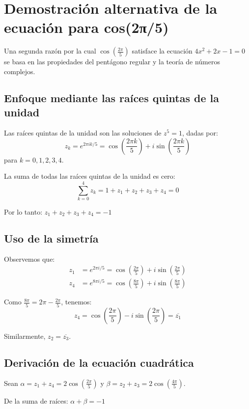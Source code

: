 \section{Demostración alternativa de la ecuación para cos(2π/5)}\label{sec:demostracion_alternativa}

Una segunda razón por la cual $\cos\left(\frac{2\pi}{5}\right)$ satisface la ecuación $4x^2 + 2x - 1 = 0$ se basa en las propiedades del pentágono regular y la teoría de números complejos.

\subsection{Enfoque mediante las raíces quintas de la unidad}

Las raíces quintas de la unidad son las soluciones de $z^5 = 1$, dadas por:
\[
z_k = e^{2\pi i k/5} = \cos\left(\frac{2\pi k}{5}\right) + i\sin\left(\frac{2\pi k}{5}\right)
\]
para $k = 0, 1, 2, 3, 4$.

La suma de todas las raíces quintas de la unidad es cero:
\[
\sum_{k=0}^{4} z_k = 1 + z_1 + z_2 + z_3 + z_4 = 0
\]

Por lo tanto: $z_1 + z_2 + z_3 + z_4 = -1$

\subsection{Uso de la simetría}

Observemos que:
\begin{align}
z_1 &= e^{2\pi i/5} = \cos\left(\frac{2\pi}{5}\right) + i\sin\left(\frac{2\pi}{5}\right) \\
z_4 &= e^{8\pi i/5} = \cos\left(\frac{8\pi}{5}\right) + i\sin\left(\frac{8\pi}{5}\right)
\end{align}

Como $\frac{8\pi}{5} = 2\pi - \frac{2\pi}{5}$, tenemos:
\[
z_4 = \cos\left(\frac{2\pi}{5}\right) - i\sin\left(\frac{2\pi}{5}\right) = \overline{z_1}
\]

Similarmente, $z_2 = \overline{z_3}$.

\subsection{Derivación de la ecuación cuadrática}

Sean $\alpha = z_1 + z_4 = 2\cos\left(\frac{2\pi}{5}\right)$ y $\beta = z_2 + z_3 = 2\cos\left(\frac{4\pi}{5}\right)$.

De la suma de raíces: $\alpha + \beta = -1$

